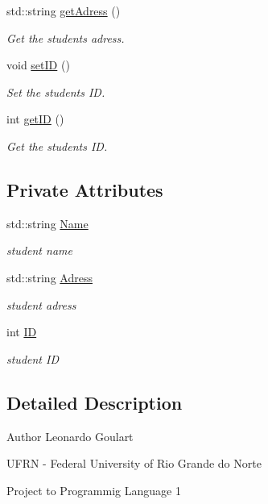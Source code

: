 \begin{DoxyCompactItemize}
std\+::string \hyperlink{classStudent_aeb78f390f160a1bcad595e7487cdf881}{get\+Adress} ()
\begin{DoxyCompactList}\small\item\em Get the student\textquotesingle{}s adress. \end{DoxyCompactList}\item 
void \hyperlink{classStudent_ae4d074aadddc5f9715822bb8ed88f4b3}{set\+ID} ()
\begin{DoxyCompactList}\small\item\em Set the student\textquotesingle{}s ID. \end{DoxyCompactList}\item 
int \hyperlink{classStudent_ad9ecfdedf31773046febf2ff3edf798e}{get\+ID} ()
\begin{DoxyCompactList}\small\item\em Get the student\textquotesingle{}s ID. \end{DoxyCompactList}\end{DoxyCompactItemize}
\subsection*{Private Attributes}
\begin{DoxyCompactItemize}
\item 
std\+::string \hyperlink{classStudent_a914e02c29156e1a3b1b51cad6bbc9083}{Name}
\begin{DoxyCompactList}\small\item\em student name \end{DoxyCompactList}\item 
std\+::string \hyperlink{classStudent_a2ce7f219072c295b7f3bc95db09625f3}{Adress}
\begin{DoxyCompactList}\small\item\em student adress \end{DoxyCompactList}\item 
int \hyperlink{classStudent_abb8d0bd3565b4c8ce2b37247542283b5}{ID}
\begin{DoxyCompactList}\small\item\em student ID \end{DoxyCompactList}\end{DoxyCompactItemize}


\subsection{Detailed Description}
\begin{DoxyAuthor}{Author}
Leonardo Goulart 

U\+F\+RN -\/ Federal University of Rio Grande do Norte 

Project to Programmig Language 1 
\end{DoxyAuthor}


